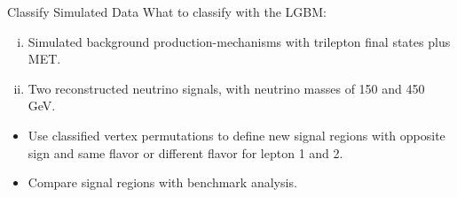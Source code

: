 \documentclass[notes]{beamer}
\begin{document}
	\begin{frame}[t]{Classify Simulated Data}
		What to classify with the LGBM:
		\begin{enumerate}[(i)]
			\item Simulated background production-mechanisms with trilepton final states plus MET.
			\item Two reconstructed neutrino signals, with neutrino masses of 150 and 450 GeV.
		\end{enumerate}
	
		\begin{itemize}
			\item Use classified vertex permutations to define new signal regions with opposite sign and same flavor or different flavor for lepton 1 and 2.
			\item Compare signal regions with benchmark analysis.
		\end{itemize}
	\end{frame}
\end{document}
